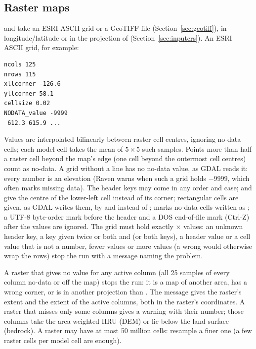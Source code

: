 \subsection{Raster maps}\label{sec:rasters}
 and  take an ESRI ASCII grid or a GeoTIFF file (Section~\ref{sec:geotiff}), in
longitude/latitude or in the projection of  (Section~\ref{sec:inputcrs}). An ESRI ASCII grid, for example:
\par\noindent\begin{minipage}{\linewidth}
\begin{lstlisting}
ncols 125
nrows 115
xllcorner -126.6
yllcorner 58.1
cellsize 0.02
NODATA_value -9999
 612.3 615.9 ...
\end{lstlisting}
\end{minipage}\par\smallskip
Values are interpolated bilinearly between raster cell centres, ignoring no-data cells; each model cell takes the mean of
$5\times5$ such samples. Points more than half a raster cell beyond the map's edge (one cell beyond the outermost cell centres) count as no-data. A grid without a
 line has no no-data value, as GDAL reads it: every number is an elevation (Raven warns when such a grid
holds $-9999$, which often marks missing data). The header keys may come in any order and case;  and
 give the centre of the lower-left cell instead of its corner; rectangular cells are given, as GDAL writes
them, by  and  instead of ;  marks no-data cells written as
; a UTF-8 byte-order mark before the header and a DOS end-of-file mark (Ctrl-Z) after the values are ignored. The grid must hold exactly $\times$ values: an unknown header key, a key given twice or both
 and  (or both  keys), a header value or a
cell value that is not a number, fewer values or more values (a wrong  would otherwise wrap the rows) stop
the run with a message naming the problem.

A raster that gives no value for any active column (all 25 samples of every column no-data or off the map) stops the run:
it is a map of another area, has a wrong corner, or is in another projection than . The message gives the
raster's extent and the extent of the active columns, both in the raster's coordinates. A raster that misses only some
columns gives a warning with their number; those columns take the area-weighted HRU  (DEM) or lie
 below the land surface (bedrock). A raster may have at most 50 million cells: resample a
finer one (a few raster cells per model cell are enough).

